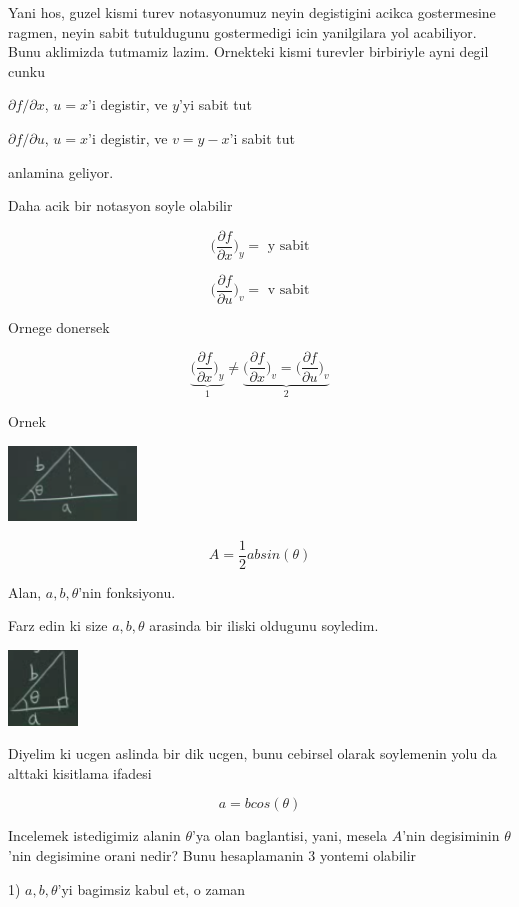 \documentclass[12pt,fleqn]{article}\usepackage{../common}
\begin{document}
Yani hos, guzel kismi turev notasyonumuz neyin degistigini acikca
gostermesine ragmen, neyin sabit tutuldugunu gostermedigi icin yanilgilara
yol acabiliyor. Bunu aklimizda tutmamiz lazim. Ornekteki kismi turevler
birbiriyle ayni degil cunku 

$\partial f/\partial x$, $u=x$'i degistir, ve $y$'yi sabit tut

$\partial f/\partial u$, $u=x$'i degistir, ve $v = y-x$'i sabit tut

anlamina geliyor. 

Daha acik bir notasyon soyle olabilir

\[ 
\bigg( \frac{\partial f}{\partial x}  \bigg)_y = \textrm { y sabit}
 \]

\[ 
\bigg( \frac{\partial f}{\partial u}  \bigg)_v = \textrm { v sabit}
 \]

Ornege donersek

\[ 
\underbrace{
\bigg( \frac{\partial f}{\partial x}  \bigg)_y 
}_{1} 
\ne 
\underbrace{
\bigg( \frac{\partial f}{\partial x}  \bigg)_v = 
\bigg( \frac{\partial f}{\partial u}  \bigg)_v 
}_{2}
 \]

Ornek

\includegraphics[height=2cm]{14_1.png}

\[ A = \frac{1}{2}absin(\theta) \]

Alan, $a,b,\theta$'nin fonksiyonu. 

Farz edin ki size $a,b,\theta$ arasinda bir iliski oldugunu soyledim. 

\includegraphics[height=2cm]{14_2.png}

Diyelim ki ucgen aslinda bir dik ucgen, bunu cebirsel olarak soylemenin
yolu da alttaki kisitlama ifadesi

\[ a = bcos(\theta) \]

Incelemek istedigimiz alanin $\theta$'ya olan baglantisi, yani, mesela
$A$'nin degisiminin $\theta$'nin degisimine orani nedir? Bunu hesaplamanin
3 yontemi olabilir

1) $a,b,\theta$'yi bagimsiz kabul et, o zaman
\end{document}
